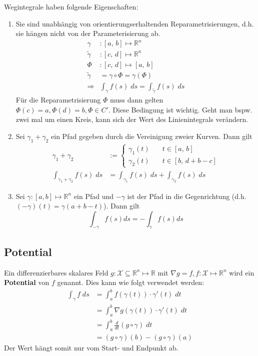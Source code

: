 \documentclass[a4paper,10pt]{article}
\def\R{\mathbb{R}}
\def\X{\mathcal{X}}
\begin{document}
Wegintegrale haben folgende Eigenschaften:
\begin{enumerate}
  \item Sie sind unabhängig von orientierungserhaltenden Reparametrisierungen, d.h. sie hängen nicht von der Parameterisierung ab. 
  \begin{align*}
    \gamma&: [a,\, b] \mapsto \R^n\\
    \tilde{\gamma}&: [c,\, d] \mapsto \R^n\\
    \varPhi&: [c, \, d] \mapsto [a, \, b]\\
    \tilde{\gamma} &= \gamma \circ \varPhi = \gamma(\varPhi)\\
    \Rightarrow &\int_\gamma f(s) \; ds = \int_{\tilde{\gamma}} f(s) \; ds
  \end{align*}
  Für die Reparametrisierung $\varPhi$ muss dann gelten $\varPhi(c) = a, \varPhi(d) = b, \varPhi \in C'$. Diese Bedingung ist wichtig. Geht man bspw. zwei mal um einen Kreis, kann sich der Wert des Linienintegrals verändern.
  \item Sei \(\gamma_1 + \gamma_2\) ein Pfad gegeben durch die Vereinigung zweier Kurven. Dann gilt
  \begin{align*}
    \gamma_1 + \gamma_2 &:=
    \begin{cases}
      \gamma_1(t) \quad& t \in [a, \, b]\\
      \gamma_2(t) \quad& t \in [b, \, d + b - c]
    \end{cases}\\
    \int_{\gamma_1 + \gamma_2} f(s) \; ds &= \int_{\gamma_1} f(s) \; ds + \int_{\gamma_2} f(s)\; ds
  \end{align*}
  \item Sei \(\gamma : \left[a,b\right] \mapsto \R^n\) ein Pfad und \(-\gamma\) ist der Pfad in die Gegenrichtung (d.h. \((-\gamma)(t) = \gamma(a + b - t)\)). Dann gilt
  \[\int_{-\gamma} f(s)ds = -\int_\gamma f(s) ds\]
\end{enumerate}

\subsection{Potential}
Ein differenzierbares skalares Feld \(g: \X \subseteq \R^n \mapsto \R\) mit \(\nabla g = f, f: \X \mapsto \R^n\) wird ein \textbf{Potential} von \(f\) genannt. Dies kann wie folgt verwendet werden:
\begin{align*}
  \int_\gamma f \; ds &= \int_a^b f(\gamma(t)) \cdot \gamma'(t) \; dt\\
  &= \int_a^b \nabla g(\gamma(t)) \cdot \gamma'(t) \; dt\\
  &= \int_a^b \frac{d}{dt} (g \circ \gamma) \; dt\\
  &= (g \circ \gamma)(b) - (g \circ \gamma)(a)
\end{align*}
Der Wert hängt somit nur vom Start- und Endpunkt ab.
\end{document}
